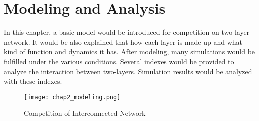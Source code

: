 
\chapter{Modeling and Analysis}
\label{chap:modeling and analysis methods}
In this chapter, a basic model would be introduced for competition on two-layer network. It would be also explained that how each layer is made up and what kind of function and dynamics it has. After modeling, many simulations would be fulfilled under the various conditions. Several indexes would be provided to analyze the interaction between two-layers. Simulation results would be analyzed with these indexes. 
\begin{figure}[!htb]
	\centering
	\texttt{[image: chap2\_modeling.png]}
	\caption{Competition of Interconnected Network}
	\label{chap2_modeling}
\end{figure}
 
